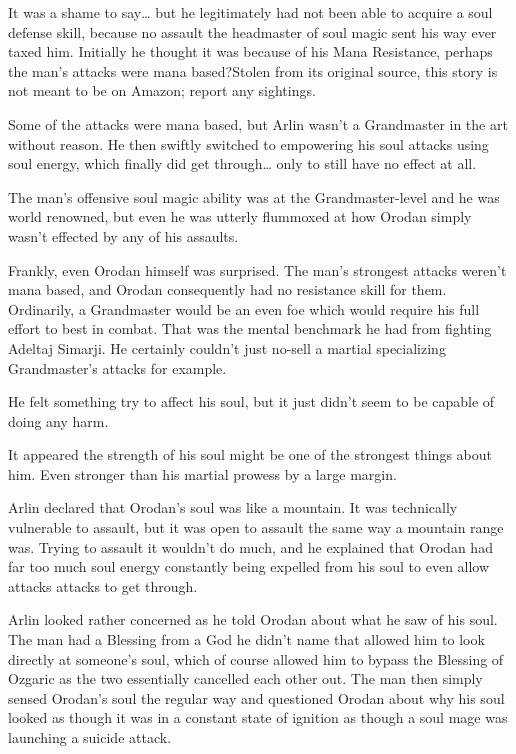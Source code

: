 \documentclass[a4paper,10pt]{book}
\begin{document}
It was a shame to say… but he legitimately had not been able to acquire a soul defense skill, because no assault the headmaster of soul magic sent his way ever taxed him. Initially he thought it was because of his Mana Resistance, perhaps the man’s attacks were mana based?Stolen from its original source, this story is not meant to be on Amazon; report any sightings.\par
Some of the attacks were mana based, but Arlin wasn’t a Grandmaster in the art without reason. He then swiftly switched to empowering his soul attacks using soul energy, which finally did get through… only to still have no effect at all.\par
The man’s offensive soul magic ability was at the Grandmaster-level and he was world renowned, but even he was utterly flummoxed at how Orodan simply wasn’t effected by any of his assaults.\par
Frankly, even Orodan himself was surprised. The man’s strongest attacks weren’t mana based, and Orodan consequently had no resistance skill for them. Ordinarily, a Grandmaster would be an even foe which would require his full effort to best in combat. That was the mental benchmark he had from fighting Adeltaj Simarji. He certainly couldn’t just no-sell a martial specializing Grandmaster’s attacks for example.\par
He felt something try to affect his soul, but it just didn’t seem to be capable of doing any harm.\par
It appeared the strength of his soul might be one of the strongest things about him. Even stronger than his martial prowess by a large margin.\par
Arlin declared that Orodan’s soul was like a mountain. It was technically vulnerable to assault, but it was open to assault the same way a mountain range was. Trying to assault it wouldn’t do much, and he explained that Orodan had far too much soul energy constantly being expelled from his soul to even allow attacks attacks to get through.\par
Arlin looked rather concerned as he told Orodan about what he saw of his soul. The man had a Blessing from a God he didn’t name that allowed him to look directly at someone’s soul, which of course allowed him to bypass the Blessing of Ozgaric as the two essentially cancelled each other out. The man then simply sensed Orodan’s soul the regular way and questioned Orodan about why his soul looked as though it was in a constant state of ignition as though a soul mage was launching a suicide attack.\par
\end{document}
